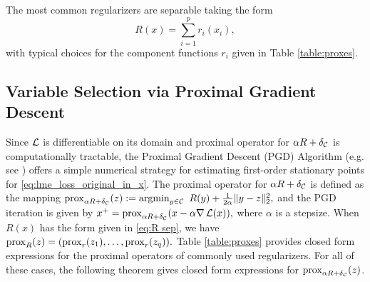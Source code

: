 The most common regularizers are separable taking the form
\begin{equation}\label{eq:R sep}
R(x) = \sum_{i = 1}^p r_i(x_i), 
\end{equation}
with typical choices for the component functions $r_i$ given in Table \ref{table:proxes}.




\subsection{Variable Selection via Proximal Gradient Descent}

Since $\operatorname{\mathcal{L}}$ is differentiable on its domain and 
proximal operator
for $\alpha R + \delta_{\mathcal{C}}$ is 
computationally tractable, 
the Proximal Gradient Descent (PGD) Algorithm (e.g. see \cite{AB17}) offers a simple numerical
strategy for estimating first-order stationary points for 
\eqref{eq:lme_loss_original_in_x}.
%
The proximal operator for 
$\alpha R + \delta_{\mathcal{C}}$ is defined as the mapping
\( %
    \prox_{\alpha R + \delta_{\CC}}(z) := \argmin_{y\in \CC}\ R(y) + \frac{1}{2\alpha}\|y - z\|_2^2 ,
\) %
and the PGD iteration is given by
\(
    x^+ = {\mathrm{prox}}_{\alpha R + \delta_{\mathcal{C}}}(x - \alpha \nabla \operatorname{\mathcal{L}}(x)),
\)
where $\alpha$ is a stepsize.
When $R(x)$ has the form given in \eqref{eq:R sep}, we have
\(
 {\mathrm{prox}}_{R}(z) = ({\mathrm{prox}}_r(z_1), \dots, {\mathrm{prox}}_r(z_q)) .
\)
Table \ref{table:proxes} provides closed form expressions for the proximal operators 
of commonly used regularizers. 
For all of these cases,  the following theorem gives closed form expressions for
${\mathrm{prox}}_{\alpha R + \delta_{\mathcal{C}}}(z)$.


